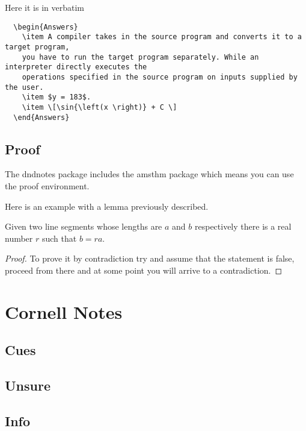 \documentclass[letterpaper,10pt,twoside,onecolumn,openany,draft]{book}
\begin{document}
Here it is in verbatim
\begin{verbatim}
  \begin{Answers}
    \item A compiler takes in the source program and converts it to a target program, 
    you have to run the target program separately. While an interpreter directly executes the 
    operations specified in the source program on inputs supplied by the user. 
    \item $y = 183$. 
    \item \[\sin{\left(x \right)} + C \]
  \end{Answers} 
\end{verbatim}

\section{Proof}
The dndnotes package includes the amsthm package which means you can use the proof environment.

Here is an example with a lemma previously described. 
\begin{Lemma}
Given two line segments whose lengths are $a$ and $b$ respectively there 
is a real number $r$ such that $b=ra$.
\end{Lemma}
\begin{proof}
  To prove it by contradiction try and assume that the statement is false,
  proceed from there and at some point you will arrive to a contradiction.
\end{proof}

\chapter{Cornell Notes}
\section{Cues}
\lipsum[1][1-5]
\lipsum[1][6-10]

\section{Unsure}
\lipsum[2][1-5]
\lipsum[2][6-10]

\section{Info}
\lipsum[3][1-5]
\lipsum[3][6-10]
\end{document}
